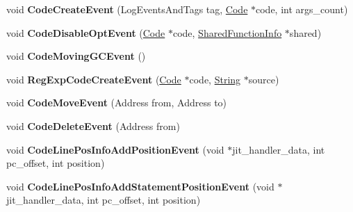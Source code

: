 \begin{DoxyCompactItemize}
\item 
\hypertarget{classv8_1_1internal_1_1_logger_a417d11a66590fa007b3f4b3d4fec2ffa}{}void {\bfseries Code\+Create\+Event} (Log\+Events\+And\+Tags tag, \hyperlink{classv8_1_1internal_1_1_code}{Code} $\ast$code, int args\+\_\+count)\label{classv8_1_1internal_1_1_logger_a417d11a66590fa007b3f4b3d4fec2ffa}

\item 
\hypertarget{classv8_1_1internal_1_1_logger_a7c8d1af8b5338cca98b09b6d7bf716eb}{}void {\bfseries Code\+Disable\+Opt\+Event} (\hyperlink{classv8_1_1internal_1_1_code}{Code} $\ast$code, \hyperlink{classv8_1_1internal_1_1_shared_function_info}{Shared\+Function\+Info} $\ast$shared)\label{classv8_1_1internal_1_1_logger_a7c8d1af8b5338cca98b09b6d7bf716eb}

\item 
\hypertarget{classv8_1_1internal_1_1_logger_a45517be4c0f8a6707c6a9973b8e7f3df}{}void {\bfseries Code\+Moving\+G\+C\+Event} ()\label{classv8_1_1internal_1_1_logger_a45517be4c0f8a6707c6a9973b8e7f3df}

\item 
\hypertarget{classv8_1_1internal_1_1_logger_a264569944a7e037dc3c4b87ab4f876ef}{}void {\bfseries Reg\+Exp\+Code\+Create\+Event} (\hyperlink{classv8_1_1internal_1_1_code}{Code} $\ast$code, \hyperlink{classv8_1_1internal_1_1_string}{String} $\ast$source)\label{classv8_1_1internal_1_1_logger_a264569944a7e037dc3c4b87ab4f876ef}

\item 
\hypertarget{classv8_1_1internal_1_1_logger_ad19e4748b92826f1a5f505203487bbcf}{}void {\bfseries Code\+Move\+Event} (Address from, Address to)\label{classv8_1_1internal_1_1_logger_ad19e4748b92826f1a5f505203487bbcf}

\item 
\hypertarget{classv8_1_1internal_1_1_logger_a960b5f7f725b44047ec9ded2e81cfcbb}{}void {\bfseries Code\+Delete\+Event} (Address from)\label{classv8_1_1internal_1_1_logger_a960b5f7f725b44047ec9ded2e81cfcbb}

\item 
\hypertarget{classv8_1_1internal_1_1_logger_a5c4568776f8915aea5cc7a132894b80f}{}void {\bfseries Code\+Line\+Pos\+Info\+Add\+Position\+Event} (void $\ast$jit\+\_\+handler\+\_\+data, int pc\+\_\+offset, int position)\label{classv8_1_1internal_1_1_logger_a5c4568776f8915aea5cc7a132894b80f}

\item 
\hypertarget{classv8_1_1internal_1_1_logger_a651db265581770a497a0e155583056cb}{}void {\bfseries Code\+Line\+Pos\+Info\+Add\+Statement\+Position\+Event} (void $\ast$jit\+\_\+handler\+\_\+data, int pc\+\_\+offset, int position)\label{classv8_1_1internal_1_1_logger_a651db265581770a497a0e155583056cb}


\end{DoxyCompactItemize}
